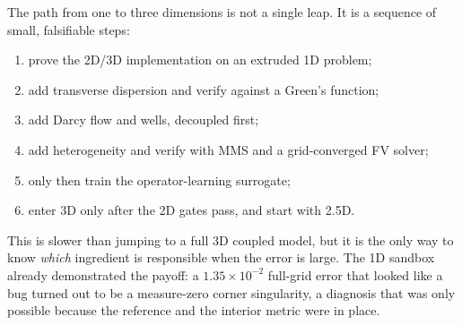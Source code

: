 \documentclass[11pt]{article}
\begin{document}
The path from one to three dimensions is not a single leap.  It is a sequence
of small, falsifiable steps:
\begin{enumerate}[leftmargin=1.6em,itemsep=2pt]
  \item prove the 2D/3D implementation on an extruded 1D problem;
  \item add transverse dispersion and verify against a Green's function;
  \item add Darcy flow and wells, decoupled first;
  \item add heterogeneity and verify with MMS and a grid-converged FV solver;
  \item only then train the operator-learning surrogate;
  \item enter 3D only after the 2D gates pass, and start with 2.5D.
\end{enumerate}
This is slower than jumping to a full 3D coupled model, but it is the only way
to know \emph{which} ingredient is responsible when the error is large.  The
1D sandbox already demonstrated the payoff: a $1.35\times10^{-2}$ full-grid
error that looked like a bug turned out to be a measure-zero corner
singularity, a diagnosis that was only possible because the reference and the
interior metric were in place.
\end{document}
